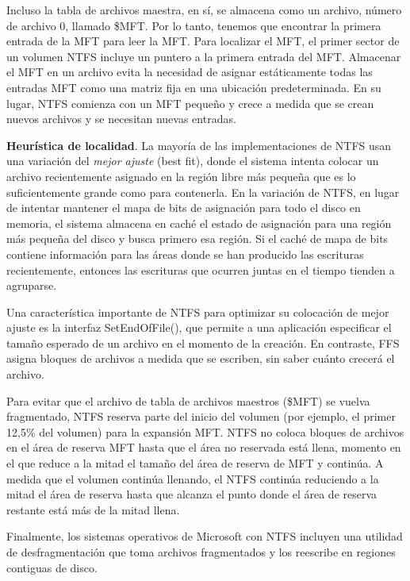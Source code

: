 \documentclass[10pt]{book}
\begin{document}
Incluso la tabla de archivos maestra, en sí, se almacena como un archivo, número de archivo 0, llamado \$MFT. Por lo tanto, tenemos que encontrar la primera entrada de la MFT para leer la MFT. Para localizar el MFT, el primer sector de un volumen NTFS incluye un puntero a la primera entrada del MFT. Almacenar el MFT en un archivo evita la necesidad de asignar estáticamente todas las entradas MFT como una matriz fija en una ubicación predeterminada. En su lugar, NTFS comienza con un MFT pequeño y crece a medida que se crean nuevos archivos y se necesitan nuevas entradas.

\textbf{Heurística de localidad}.
La mayoría de las implementaciones de NTFS usan una variación del \textit{mejor ajuste} (best fit), donde el sistema intenta colocar un archivo recientemente asignado en la región libre más pequeña que es lo suficientemente grande como para contenerla. En la variación de NTFS, en lugar de intentar mantener el mapa de bits de asignación para todo el disco en memoria, el sistema almacena en caché el estado de asignación para una región más pequeña del disco y busca primero esa región. Si el caché de mapa de bits contiene información para las áreas donde se han producido las escrituras recientemente, entonces las escrituras que ocurren juntas en el tiempo tienden a agruparse.

Una característica importante de NTFS para optimizar su colocación de mejor ajuste es la interfaz {\mf SetEndOfFile()}, que permite a una aplicación especificar el tamaño esperado de un archivo en el momento de la creación. En contraste, FFS asigna bloques de archivos a medida que se escriben, sin saber cuánto crecerá el archivo.

Para evitar que el archivo de tabla de archivos maestros (\$MFT) se vuelva fragmentado, NTFS reserva parte del inicio del volumen (por ejemplo, el primer 12,5\% del volumen) para la expansión MFT. NTFS no coloca bloques de archivos en el área de reserva MFT hasta que el área no reservada está llena, momento en el que reduce a la mitad el tamaño del área de reserva de MFT y continúa. A medida que el volumen continúa llenando, el NTFS continúa reduciendo a la mitad el área de reserva hasta que alcanza el punto donde el área de reserva restante está más de la mitad llena.

Finalmente, los sistemas operativos de Microsoft con NTFS incluyen una utilidad de desfragmentación que toma archivos fragmentados y los reescribe en regiones contiguas de disco.


\nocite{*}


\end{document}
